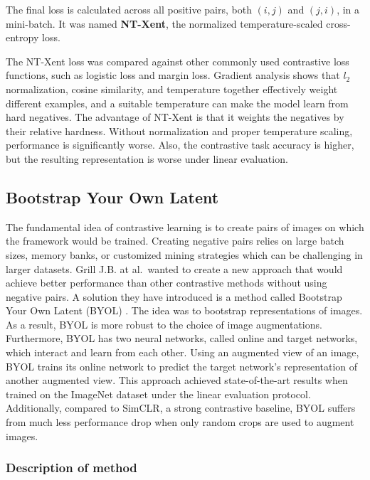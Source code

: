 \documentclass[
]{krantz}
\begin{document}
The final loss is calculated across all positive pairs, both \(\left( i,j \right)\) and \(\left( j,i \right)\), in a mini-batch. It was named \textbf{NT-Xent}, the normalized temperature-scaled cross-entropy loss.

The NT-Xent loss was compared against other commonly used contrastive loss functions, such as logistic loss and margin loss. Gradient analysis shows that \(l_2\) normalization, cosine similarity, and temperature together effectively weight different examples, and a suitable temperature can make the model learn from hard negatives. The advantage of NT-Xent is that it weights the negatives by their relative hardness. Without normalization and proper temperature scaling, performance is significantly worse. Also, the contrastive task accuracy is higher, but the resulting representation is worse under linear evaluation.

\hypertarget{bootstrap-your-own-latent}{%
\subsection{Bootstrap Your Own Latent}\label{bootstrap-your-own-latent}}

The fundamental idea of contrastive learning is to create pairs of images on which the framework would be trained. Creating negative pairs relies on large batch sizes, memory banks, or customized mining strategies which can be challenging in larger datasets. Grill J.B. at al.~wanted to create a new approach that would achieve better performance than other contrastive methods without using negative pairs. A solution they have introduced is a method called Bootstrap Your Own Latent (BYOL) \citet{BYOL}. The idea was to bootstrap representations of images. As a result, BYOL is more robust to the choice of image augmentations.
Furthermore, BYOL has two neural networks, called online and target networks, which interact and learn from each other. Using an augmented view of an image, BYOL trains its online network to predict the target network's representation of another augmented view. This approach achieved state-of-the-art results when trained on the ImageNet dataset under the linear evaluation protocol. Additionally, compared to SimCLR, a strong contrastive baseline, BYOL suffers from much less performance drop when only random crops are used to augment images.

\hypertarget{description-of-method}{%
\subsubsection{Description of method}\label{description-of-method}}
\end{document}
